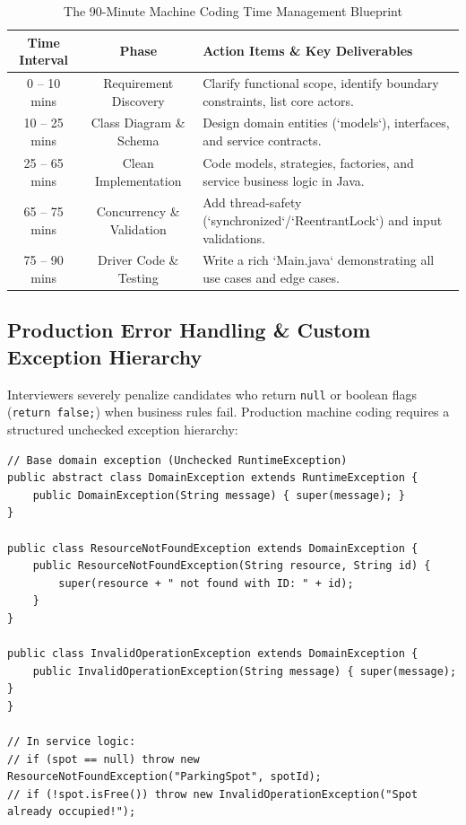 \documentclass[10pt,journal,compsoc,onecolumn]{IEEEtran}
\begin{document}
\begin{table}[htbp]
\caption{The 90-Minute Machine Coding Time Management Blueprint}
\label{tab:lld_blueprint}
\centering
\begin{tabular}{ccl}
\toprule
\textbf{Time Interval} & \textbf{Phase} & \textbf{Action Items \& Key Deliverables} \\
\midrule
0 -- 10 mins & Requirement Discovery & Clarify functional scope, identify boundary constraints, list core actors. \\
10 -- 25 mins & Class Diagram \& Schema & Design domain entities (`models`), interfaces, and service contracts. \\
25 -- 65 mins & Clean Implementation & Code models, strategies, factories, and service business logic in Java. \\
65 -- 75 mins & Concurrency \& Validation & Add thread-safety (`synchronized`/`ReentrantLock`) and input validations. \\
75 -- 90 mins & Driver Code \& Testing & Write a rich `Main.java` demonstrating all use cases and edge cases. \\
\bottomrule
\end{tabular}
\end{table}

\subsection{Production Error Handling \& Custom Exception Hierarchy}
Interviewers severely penalize candidates who return \texttt{null} or boolean flags (\texttt{return false;}) when business rules fail. Production machine coding requires a structured unchecked exception hierarchy:

\begin{verbatim}
// Base domain exception (Unchecked RuntimeException)
public abstract class DomainException extends RuntimeException {
    public DomainException(String message) { super(message); }
}

public class ResourceNotFoundException extends DomainException {
    public ResourceNotFoundException(String resource, String id) {
        super(resource + " not found with ID: " + id);
    }
}

public class InvalidOperationException extends DomainException {
    public InvalidOperationException(String message) { super(message); }
}

// In service logic:
// if (spot == null) throw new ResourceNotFoundException("ParkingSpot", spotId);
// if (!spot.isFree()) throw new InvalidOperationException("Spot already occupied!");
\end{verbatim}
\end{document}
